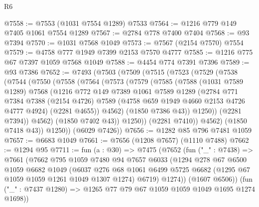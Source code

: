 \begin{lexlean}{R6}
\begin{coremodule}
@7558 := @7553 (@1031 @7554 @1289) @7533
@7564 := @1216 @779 @149 @7405 @1061 @7554 @1289
@7567 := @2784 @778 @7400 @7404
@7568 := @93 @7394
@7570 := @1031 @7568 @1049
@7573 := @7567 (@2154 @7570) @7554
@7579 := @4758 @777 @1949 @7399 @2153 @7570 @4777
@7585 := @1216 @775 @67 @7397 @1059 @7568 @1049
@7588 := @4454 @774 @7391 @7396
@7589 := @93 @7386
@7652 := @7493
    (@7503
      (@7509
        (@7515
          (@7523
            (@7529
              (@7538
                (@7544
                  (@7550
                    (@7558
                      (@7564
                        (@7573
                          (@7579
                            (@7585
                              (@7588
                                (@1031 @7589 @1289)
                                @7568
                                (@1216
                                  @772
                                  @149
                                  @7389
                                  @1061
                                  @7589
                                  @1289
                                  (@2784
                                    @771
                                    @7384
                                    @7388
                                    (@2154 @4726)
                                    @7589
                                    (@4758 @659 @1949 @4660 @2153 @4726 @4777 @4924)
                                    (@2281 @4655))
                                  @4562)
                                (@1850 @7386 @43))
                              @1250))
                          (@2281 @7394))
                        @4562)
                      (@1850 @7402 @43))
                    @1250))
                (@2281 @7410))
              @4562)
            (@1850 @7418 @43))
          @1250))
      (@6029 @7426))
@7656 := @1282 @85 @796 @7481 @1059
@7657 := @6683 @1049
@7661 := @7656 (@1208 @7657) (@1110 @7488)
@7662 := @1294 @95
@7711 := fun (a : @30) =>
  @7475
    (@7652
      (fun ("_" : @7438) =>
      @7661
        (@7662
          @795
          @1059
          @7480
          @94
          @7657
          @6033
          (@1294
            @278
            @67
            @6500
            @1059
            @6682
            @1049
            (@6037
              @276
              @68
              @1061
              @6499
              @5725
              @6682
              (@1295 @67 @1059 @1059 @1261 @1049 @1307 @1274)
              @6719)
            @1274))
        (@1607 @6506))
      (fun ("_" : @7437 @1280) => @1265 @77 @79 @67 @1059 @1059 @1049 @1695 @1274 @1698))

\end{coremodule}
\end{lexlean}
